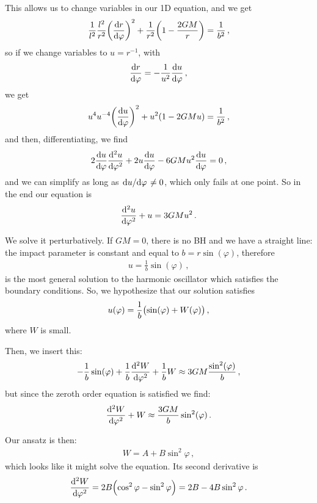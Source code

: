 \documentclass[main.tex]{subfiles}
\begin{document}
This allows us to change variables in our 1D equation, and we get 
%
\begin{align}
\frac{1}{l^2} \frac{l^2}{r^2} \qty(\dv{r}{\varphi })^2 + \frac{1}{r^2}\qty(1 - \frac{2GM}{r}) = \frac{1}{b^2}
\,,
\end{align}
%
so if we change variables to \(u = r^{-1}\), with 
%
\begin{align}
  \dv{r}{\varphi } = -\frac{1}{u^2} \dv{u }{\varphi }
\,,
\end{align}
%
we  get 
%
\begin{align}
  u^{4} u^{-4} \qty(\dv{u}{\varphi } )^2+ u^2 \qty(1-2GMu) = \frac{1}{b^2}
\,,
\end{align}
%
and then, differentiating, we find 
%
\begin{align}
  2 \dv{u}{\varphi } \dv[2]{u}{\varphi } + 2 u \dv{u}{\varphi } - 6GM u^2 \dv{u}{\varphi }= 0
\,,
\end{align}
%
and we can simplify as long as \(\dv*{u}{\varphi } \neq 0\), which only fails at one point. So in the end our equation is 
%
\begin{align}
  \dv[2]{u}{\varphi } + u = 3GMu^2
\,.
\end{align}
%

We solve it perturbatively. 
If \(GM=0\), there is no BH and we have a straight line: the impact parameter is constant and equal to  \(b = r \sin(\varphi )\), therefore 
%
\begin{align}
  u = \frac{1}{b} \sin(\varphi )
\,,
\end{align}
%
is the most general solution to the harmonic oscillator which satisfies the boundary conditions. 
So, we hypothesize that our solution satisfies 
%
\begin{align}
  u (\varphi ) = \frac{1}{b} \qty(\sin(\varphi ) + W(\varphi ))
\,,
\end{align}
%
where \(W\) is small. 

Then, we insert this: 
%
\begin{align}
  -\frac{1}{b} \sin(\varphi ) + \frac{1}{b} \dv[2]{W}{\varphi } + \frac{1}{b} W \approx 3GM \frac{\sin^2(\varphi )}{b}
\,,
\end{align}
%
but since the zeroth order equation is satisfied we find: 
%
\begin{align}
  \dv[2]{W}{\varphi } + W \approx \frac{3GM}{b} \sin^2(\varphi )
\,. 
\end{align}

Our ansatz is then: 
%
\begin{align}
  W = A + B \sin^2 \varphi 
\,,
\end{align}
%
which looks like it might solve the equation. Its second derivative is 
%
\begin{align}
  \dv[2]{W}{\varphi } = 2B \qty(\cos^2 \varphi  - \sin^2 \varphi ) = 2B - 4B \sin^2\varphi 
\,.
\end{align}
\end{document}
